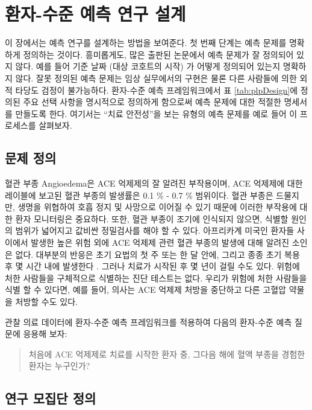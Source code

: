 \documentclass[10.5pt]{book}
\theoremstyle{definition}
\theoremstyle{definition}
\theoremstyle{definition}
\theoremstyle{remark}
\begin{document}
\section{환자-수준 예측 연구 설계}\label{----}

이 장에서는 예측 연구를 설계하는 방법을 보여준다. 첫 번째 단계는 예측
문제를 명확하게 정의하는 것이다. 흥미롭게도, 많은 출판된 논문에서 예측
문제가 잘 정의되어 있지 않다. 예를 들어 기준 날짜 (대상 코호트의 시작)
가 어떻게 정의되어 있는지 명확하지 않다. 잘못 정의된 예측 문제는 임상
실무에서의 구현은 물론 다른 사람들에 의한 외적 타당도 검정이 불가능하다.
환자-수준 예측 프레임워크에서 표 \ref{tab:plpDesign}에 정의된 주요 선택
사항을 명시적으로 정의하게 함으로써 예측 문제에 대한 적절한 명세서를
만들도록 한다. 여기서는 ``치료 안전성''을 보는 유형의 예측 문제를 예로
들어 이 프로세스를 살펴보자. 

\subsection{문제 정의}\label{--3}

혈관 부종 Angioedema은 ACE 억제제의 잘 알려진 부작용이며, ACE 억제제에
대한 레이블에 보고된 혈관 부종의 발생률은 0.1 \% - 0.7 \% 범위이다.
\citep{byrd_2006} 혈관 부종은 드물지만, 생명을 위협하여 호흡 정지 및
사망으로 이어질 수 있기 때문에 이러한 부작용에 대한 환자 모니터링은
중요하다. \citep{norman_2013} 또한, 혈관 부종이 조기에 인식되지 않으면,
식별할 원인의 범위가 넓어지고 값비싼 정밀검사를 해야 할 수 있다.
\citep{norman_2013, thompson_1993} 아프리카계 미국인 환자들 사이에서
발생한 높은 위험 외에 ACE 억제제 관련 혈관 부종의 발생에 대해 알려진
소인은 없다. \citep{byrd_2006} 대부분의 반응은 초기 요법의 첫 주 또는 한
달 안에, 그리고 종종 초기 복용 후 몇 시간 내에 발생한다
\citep{circardi_2004}. 그러나 치료가 시작된 후 몇 년이 걸릴 수도 있다.
\citep{mara_1996} 위험에 처한 사람들을 구체적으로 식별하는 진단 테스트는
없다. 우리가 위험에 처한 사람들을 식별 할 수 있다면, 예를 들어, 의사는
ACE 억제제 처방을 중단하고 다른 고혈압 약물을 처방할 수도
있다. 

관찰 의료 데이터에 환자-수준 예측 프레임워크를 적용하여 다음의 환자-수준
예측 질문에 응용해 보자:

\begin{quote}
처음에 ACE 억제제로 치료를 시작한 환자 중, 그다음 해에 혈액 부종을
경험한 환자는 누구인가?
\end{quote}

\subsection{연구 모집단 정의}\label{--}
\end{document}
